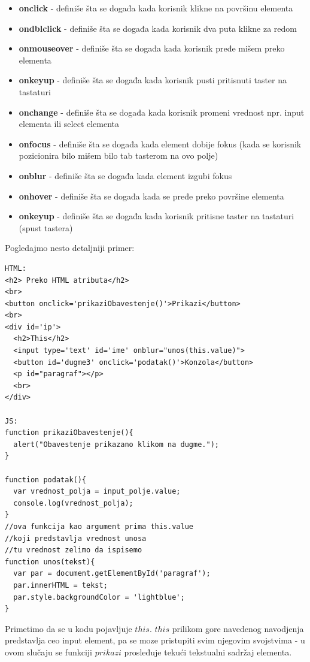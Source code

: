 \documentclass[a4paper]{article}
\begin{document}
\begin{itemize}
\item \textbf{onclick} - definiše šta se događa kada korisnik klikne na površinu elementa 
\item \textbf{ondblclick} - definiše šta se događa kada korisnik dva puta klikne za redom
\item \textbf{onmouseover} - definiše šta se događa kada korisnik pređe mišem preko elementa
\item \textbf{onkeyup} - definiše šta se događa kada korisnik pusti pritisnuti taster na tastaturi 
\item \textbf{onchange} -  definiše šta se događa kada korisnik promeni vrednost npr. input elementa ili select elementa
\item \textbf{onfocus} - definiše šta se događa kada element dobije fokus (kada se korisnik pozicionira bilo mišem bilo tab tasterom na ovo polje)
\item \textbf{onblur} - definiše šta se događa kada element izgubi fokus
\item \textbf{onhover} - definiše šta se događa kada se pređe preko površine elementa 
\item \textbf{onkeyup} - definiše šta se događa kada korisnik pritisne taster na tastaturi (spust tastera)  
\end{itemize}                        
 
Pogledajmo nesto detaljniji primer:
\begin{lstlisting}[backgroundcolor = \color{lightgray}]
HTML:
<h2> Preko HTML atributa</h2>
<br>
<button onclick='prikaziObavestenje()'>Prikazi</button>
<br>
<div id='ip'>
  <h2>This</h2>
  <input type='text' id='ime' onblur="unos(this.value)">
  <button id='dugme3' onclick='podatak()'>Konzola</button>
  <p id="paragraf"></p>
  <br>
</div>

JS:
function prikaziObavestenje(){
  alert("Obavestenje prikazano klikom na dugme.");
}

function podatak(){
  var vrednost_polja = input_polje.value;
  console.log(vrednost_polja);    
}
//ova funkcija kao argument prima this.value 
//koji predstavlja vrednost unosa
//tu vrednost zelimo da ispisemo
function unos(tekst){
  var par = document.getElementById('paragraf');
  par.innerHTML = tekst;
  par.style.backgroundColor = 'lightblue';
}           
\end{lstlisting} 

Primetimo da se u kodu pojavljuje $this$. $this$ prilikom gore navedenog navodjenja predstavlja ceo input element, pa se moze pristupiti svim njegovim svojstvima - u ovom slučaju se funkciji $prikazi$ prosleđuje tekući tekstualni sadržaj elementa.\\\\
\end{document}
